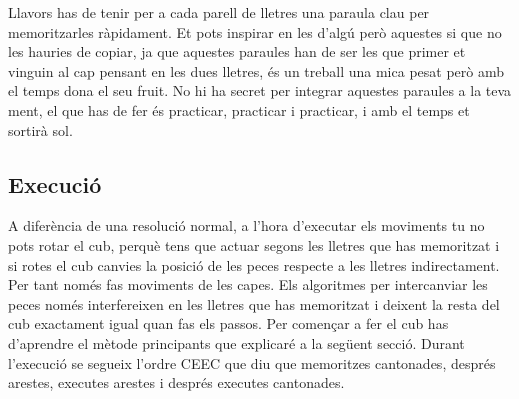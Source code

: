 Llavors has de tenir per a cada parell de lletres una paraula clau per memoritzarles ràpidament. Et pots inspirar en les d'algú però aquestes si que no les hauries de copiar, ja que aquestes paraules han de ser les que primer et vinguin al cap pensant en les dues lletres, és un treball una mica pesat però amb el temps dona el seu fruit.
No hi ha secret per integrar aquestes paraules a la teva ment, el que has de fer és practicar, practicar i practicar, i amb el temps et sortirà sol.


\subsection{Execució}

A diferència de una resolució normal, a l'hora d'executar els moviments tu no pots rotar el cub, perquè tens que actuar segons les lletres que has memoritzat i si rotes el cub canvies la posició de les peces respecte a les lletres indirectament. 
Per tant només fas moviments de les capes. Els algoritmes per intercanviar les peces només interfereixen en les lletres que has memoritzat i deixent la resta del cub exactament igual quan fas els passos. Per començar a fer el cub has d'aprendre el mètode principants que explicaré a la següent secció.
Durant l'execució se segueix l'ordre CEEC que diu que memoritzes cantonades, després arestes, executes arestes i després executes cantonades.

